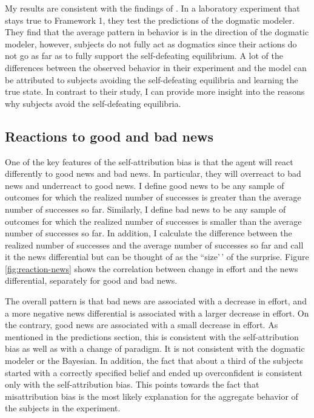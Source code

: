\documentclass[
  12pt,
]{article}
\begin{document}
My results are consistent with the findings of \citet{Gotte2022}. In a
laboratory experiment that stays true to Framework 1, they test the
predictions of the dogmatic modeler. They find that the average pattern
in behavior is in the direction of the dogmatic modeler, however,
subjects do not fully act as dogmatics since their actions do not go as
far as to fully support the self-defeating equilibrium. A lot of the
differences between the observed behavior in their experiment and the
model can be attributed to subjects avoiding the self-defeating
equilibria and learning the true state. In contrast to their study, I
can provide more insight into the reasons why subjects avoid the
self-defeating equilibria.

\hypertarget{reactions-to-good-and-bad-news}{%
\subsection{Reactions to good and bad
news}\label{reactions-to-good-and-bad-news}}

One of the key features of the self-attribution bias is that the agent
will react differently to good news and bad news. In particular, they
will overreact to bad news and underreact to good news. I define good
news to be any sample of outcomes for which the realized number of
successes is greater than the average number of successes so far.
Similarly, I define bad news to be any sample of outcomes for which the
realized number of successes is smaller than the average number of
successes so far. In addition, I calculate the difference between the
realized number of successes and the average number of successes so far
and call it the news differential but can be thought of as the
``size'\,' of the surprise. Figure \ref{fig:reaction-news} shows the
correlation between change in effort and the news differential,
separately for good and bad news.

The overall pattern is that bad news are associated with a decrease in
effort, and a more negative news differential is associated with a
larger decrease in effort. On the contrary, good news are associated
with a small decrease in effort. As mentioned in the predictions
section, this is consistent with the self-attribution bias as well as
with a change of paradigm. It is not consistent with the dogmatic
modeler or the Bayesian. In addition, the fact that about a third of the
subjects started with a correctly specified belief and ended up
overconfident is consistent only with the self-attribution bias. This
points towards the fact that misattribution bias is the most likely
explanation for the aggregate behavior of the subjects in the
experiment.
\end{document}
